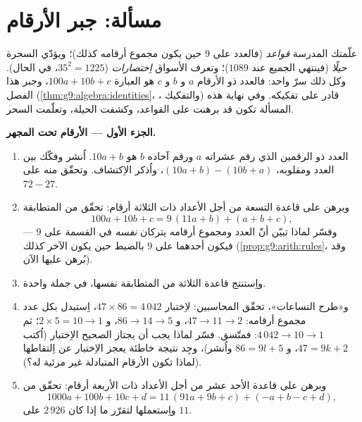 \section{مسألة: جبر الأرقام}

\begin{problem}
\label{pb:g9:algebra:1}
علّمتك المدرسة \emph{قواعد} (فالعدد  على $9$ حين
يكون مجموع أرقامه كذلك)؛ ويؤدّي السحرة \emph{حيلًا} (فينتهي
الجميع عند $1089$)؛ وتعرف الأسواق \emph{اِختصارات}
($35^2 = 1225$، في الحال). وكل ذلك سرّ واحد: فالعدد ذو الأرقام
$a$ و $b$ و $c$ هو العبارة $100a + 10b + c$، وجبر هذا الفصل
(\cref{thm:g9:algebra:identities}، ، والتفكيك) قادر
على تفكيكه. وفي نهاية هذه المسألة تكون قد برهنت على القواعد،
وكشفت الحيلة، وتعلّمت السحر.

\medskip
\noindent\textbf{الجزء الأول --- الأرقام تحت المجهر.}
\begin{enumerate}
  \item العدد ذو الرقمين الذي رقم عشراته $a$ ورقم آحاده $b$ هو
        $10a + b$. اُنشر وفكّك  بين العدد ومقلوبه،
        $(10a + b) - (10b + a)$، واُذكر الاِكتشاف. وتحقّق منه على
        $72 - 27$.
  \item وبرهن على قاعدة التسعة من أجل الأعداد ذات الثلاثة أرقام:
        تحقّق من المتطابقة
        \[
        100a + 10b + c = 9\,(11a + b) + (a + b + c),
        \]
        وفسّر لماذا تبيّن أنّ العدد ومجموع أرقامه يتركان
        \emph{ نفسه} في القسمة على $9$ --- فيكون
        أحدهما  على $9$ بالضبط حين يكون الآخر
        كذلك (\cref{prop:g9:arith:rules}، وقد بُرهن عليها الآن).
  \item واِستنتج قاعدة الثلاثة من المتطابقة نفسها، في جملة واحدة.
  \item و«طرح التساعات»، تحقّق المحاسبين: لاِختبار
        $47 \times 86 = 4\,042$، اِستبدل بكل عدد 
        مجموع أرقامه: $47 \to 11 \to 2$، و $86 \to 14 \to 5$،
        و $2 \times 5 = 10 \to 1$؛ ثم $4\,042 \to 10 \to 1$:
        فمتّسق. فسّر لماذا يجب أن يجتاز  الصحيح
        الاِختبار (اُكتب $47 = 9k + 2$، و $86 = 9l + 5$ واُنشر)،
        وجِد نتيجة خاطئة يعجز الاِختبار عن اِلتقاطها (لماذا تكون
        الأرقام المتبادلة غير مرئية له؟).
  \item وبرهن على قاعدة الأحد عشر من أجل الأعداد ذات الأربعة
        أرقام: تحقّق من
        \[
        1000a + 100b + 10c + d
        = 11\,(91a + 9b + c) + (- a + b - c + d),
        \]
        واِستعملها لتقرّر ما إذا كان $2\,926$ 
        على $11$.
\end{enumerate}


\end{problem}

